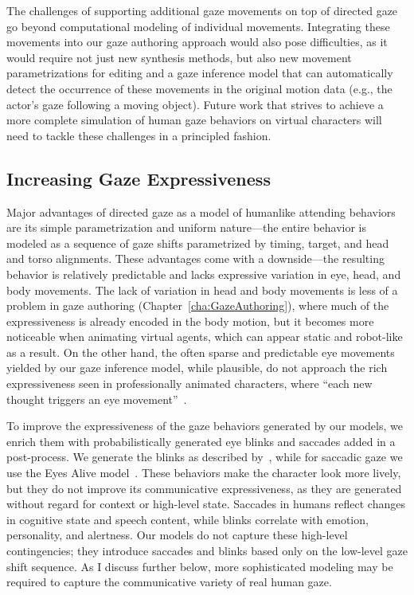 The challenges of supporting additional gaze movements on top of directed gaze go beyond computational modeling of individual movements. Integrating these movements into our gaze authoring approach would also pose difficulties, as it would require not just new synthesis methods, but also new movement parametrizations for editing and a gaze inference model that can automatically detect the occurrence of these movements in the original motion data (e.g., the actor's gaze following a moving object). Future work that strives to achieve a more complete simulation of human gaze behaviors on virtual characters will need to tackle these challenges in a principled fashion.

\subsection{Increasing Gaze Expressiveness}

Major advantages of directed gaze as a model of humanlike attending behaviors are its simple parametrization and uniform nature---the entire behavior is modeled as a sequence of gaze shifts parametrized by timing, target, and head and torso alignments. These advantages come with a downside---the resulting behavior is relatively predictable and lacks expressive variation in eye, head, and body movements. The lack of variation in head and body movements is less of a problem in gaze authoring (Chapter~\ref{cha:GazeAuthoring}), where much of the expressiveness is already encoded in the body motion, but it becomes more noticeable when animating virtual agents, which can appear static and robot-like as a result.
On the other hand, the often sparse and predictable eye movements yielded by our gaze inference model, while plausible, do not approach the rich expressiveness seen in professionally animated characters, where ``each new thought triggers an eye movement''~\citep{maestri2001digital}.

To improve the expressiveness of the gaze behaviors generated by our models, we enrich them with probabilistically generated eye blinks and saccades added in a post-process. We generate the blinks as described by~\citet{peters2010animating}, while for saccadic gaze we use the Eyes Alive model~\citep{lee2002eyes}. These behaviors make the character look more lively, but they do not improve its communicative expressiveness, as they are generated without regard for context or high-level state. Saccades in humans reflect changes in cognitive state and speech content, while blinks correlate with emotion, personality, and alertness. Our models do not capture these high-level contingencies; they introduce saccades and blinks based only on the low-level gaze shift sequence. As I discuss further below, more sophisticated modeling may be required to capture the communicative variety of real human gaze.

